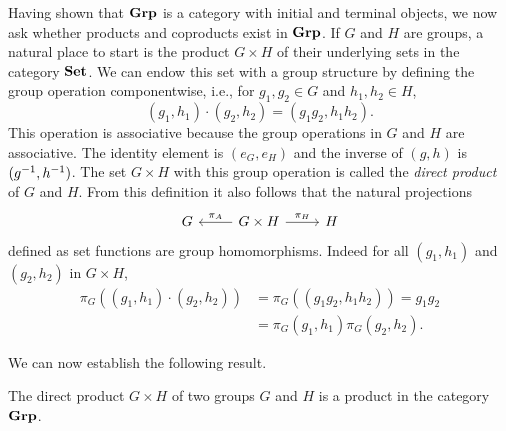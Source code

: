 Having shown that \(\mathbf{Grp}\) is a category with initial and terminal objects, we
now ask whether products and coproducts exist in \(\mathbf{Grp}\). If \(G\) and \(H\)
are groups, a natural place to start is the product \(G \times H\) of their
underlying sets in the category \(\mathbf{Set}\). We can endow this set with a group
structure by defining the group operation componentwise, i.e., for \(g_1, g_2
\in G\) and \(h_1, h_2 \in H\),
\[
    (g_1, h_1) \cdot (g_2, h_2) = (g_1g_2, h_1h_2).
\]
This operation is associative because the group operations in \(G\) and \(H\)
are associative. The identity element is \((e_G, e_H)\) and the inverse of \((g,
h)\) is \((g^{-1}, h^{-1})\). The set \(G \times H\) with this group operation is
called the \emph{direct product} of \(G\) and \(H\). From this definition it
also follows that the natural projections
\[
    \begin{tikzcd}
        G & G \times H \arrow[r, "\pi_H"] \arrow[l, "\pi_A"'] & H
    \end{tikzcd}
\]
defined as set functions are group homomorphisms. Indeed for all \((g_1, h_1)\)
and \((g_2, h_2)\) in \(G \times H\),
\begin{align*}
    \pi_G((g_1, h_1)\cdot(g_2, h_2)) & = \pi_G((g_1g_2, h_1h_2)) = g_1g_2\\
    &= \pi_G(g_1, h_1)\pi_G(g_2, h_2).
\end{align*}

We can now establish the following result.

\begin{theorem}
    The direct product \(G \times H\) of two groups \(G\) and \(H\) is a product
    in the category \(\mathbf{Grp}\).
\end{theorem}


